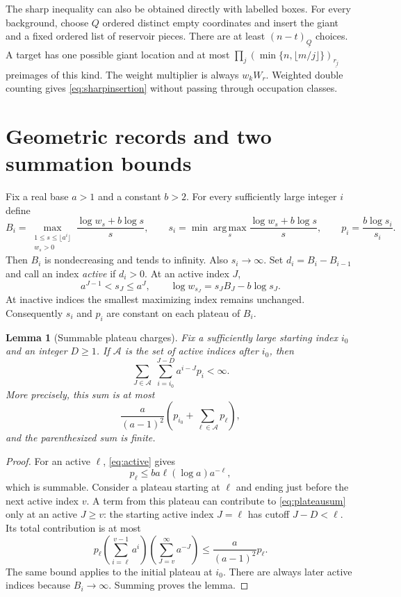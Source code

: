 \documentclass[11pt]{article}
\newtheorem{lemma}[theorem]{Lemma}
\theoremstyle{remark}\newtheorem{remark}[theorem]{Remark}
\newcommand{\fall}[2]{(#1)_{\underline{#2}}}
\begin{document}
The sharp inequality can also be obtained directly with labelled boxes.
For every background, choose $Q$ ordered distinct empty coordinates and
insert the giant and a fixed ordered list of reservoir pieces. There are
at least $\fall{n-t}{Q}$ choices. A target has one possible giant location
and at most
$\prod_j\fall{\min\{n,\lfloor m/j\rfloor\}}{r_j}$ preimages of this kind.
The weight multiplier is always $w_kW_r$. Weighted double counting gives
\eqref{eq:sharpinsertion} without passing through occupation classes.

\section{Geometric records and two summation bounds}
Fix a real base $a>1$ and a constant $b>2$. For every sufficiently large
integer $i$ define
\begin{equation}\label{eq:records}
 B_i=\max_{\substack{1\le s\le\lfloor a^i\rfloor\\w_s>0}}
       \frac{\log w_s+b\log s}{s},\qquad
 s_i=\min\operatorname*{arg\,max}_{s}\frac{\log w_s+b\log s}{s},
 \qquad p_i=\frac{b\log s_i}{s_i}.
\end{equation}
Then $B_i$ is nondecreasing and tends to infinity. Also $s_i\to\infty$.
Set $d_i=B_i-B_{i-1}$ and call an index \emph{active} if $d_i>0$. At an
active index $J$,
\begin{equation}\label{eq:active}
 a^{J-1}<s_J\le a^J,\qquad
 \log w_{s_J}=s_JB_J-b\log s_J.
\end{equation}
At inactive indices the smallest maximizing index remains unchanged.
Consequently $s_i$ and $p_i$ are constant on each plateau of $B_i$.

\begin{lemma}[Summable plateau charges]\label{lem:plateau}
Fix a sufficiently large starting index $i_0$ and an integer $D\ge1$.
If $\mathcal A$ is the set of active indices after $i_0$, then
\begin{equation}\label{eq:plateausum}
 \sum_{J\in\mathcal A}\ \sum_{i=i_0}^{J-D} a^{i-J}p_i<\infty.
\end{equation}
More precisely, this sum is at most
\[
 \frac{a}{(a-1)^2}
 \left(p_{i_0}+\sum_{\ell\in\mathcal A}p_\ell\right),
\]
and the parenthesized sum is finite.
\end{lemma}

\begin{proof}
For an active $\ell$, \eqref{eq:active} gives
\[
 p_\ell\le ba\ell(\log a)a^{-\ell},
\]
which is summable. Consider a plateau starting at $\ell$ and ending just
before the next active index $v$. A term from this plateau can contribute
to \eqref{eq:plateausum} only at an active $J\ge v$: the starting active
index $J=\ell$ has cutoff $J-D<\ell$. Its total contribution is at most
\[
 p_\ell
 \left(\sum_{i=\ell}^{v-1}a^i\right)
 \left(\sum_{J=v}^{\infty}a^{-J}\right)
 \le \frac{a}{(a-1)^2}p_\ell.
\]
The same bound applies to the initial plateau at $i_0$. There are always
later active indices because $B_i\to\infty$. Summing proves the lemma.
\end{proof}
\end{document}
